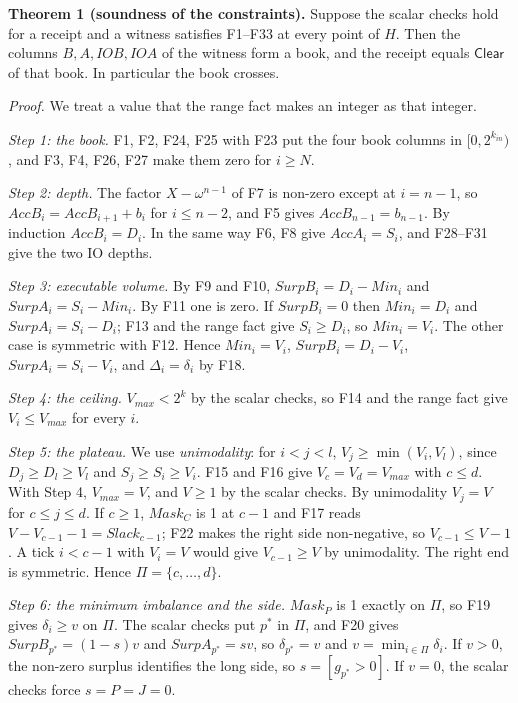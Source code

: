\textbf{Theorem 1 (soundness of the constraints).} Suppose the scalar checks hold for a receipt and a witness satisfies F1--F33 at every point of \(H\). Then the columns \(B, A, IOB, IOA\) of the witness form a book, and the receipt equals \(\mathsf{Clear}\) of that book. In particular the book crosses.

\emph{Proof.} We treat a value that the range fact makes an integer as that integer.

\emph{Step 1: the book.} F1, F2, F24, F25 with F23 put the four book columns in \([0, 2^{k_{in}})\), and F3, F4, F26, F27 make them zero for \(i \ge N\).

\emph{Step 2: depth.} The factor \(X - \omega^{n-1}\) of F7 is non-zero except at \(i = n-1\), so \(AccB_i = AccB_{i+1} + b_i\) for \(i \le n-2\), and F5 gives \(AccB_{n-1} = b_{n-1}\). By induction \(AccB_i = D_i\). In the same way F6, F8 give \(AccA_i = S_i\), and F28--F31 give the two IO depths.

\emph{Step 3: executable volume.} By F9 and F10, \(SurpB_i = D_i - Min_i\) and \(SurpA_i = S_i - Min_i\). By F11 one is zero. If \(SurpB_i = 0\) then \(Min_i = D_i\) and \(SurpA_i = S_i - D_i\); F13 and the range fact give \(S_i \ge D_i\), so \(Min_i = V_i\). The other case is symmetric with F12. Hence \(Min_i = V_i\), \(SurpB_i = D_i - V_i\), \(SurpA_i = S_i - V_i\), and \(\Delta_i = \delta_i\) by F18.

\emph{Step 4: the ceiling.} \(V_{max} < 2^k\) by the scalar checks, so F14 and the range fact give \(V_i \le V_{max}\) for every \(i\).

\emph{Step 5: the plateau.} We use \emph{unimodality}: for \(i < j < l\), \(V_j \ge \min(V_i, V_l)\), since \(D_j \ge D_l \ge V_l\) and \(S_j \ge S_i \ge V_i\). F15 and F16 give \(V_c = V_d = V_{max}\) with \(c \le d\). With Step 4, \(V_{max} = V\), and \(V \ge 1\) by the scalar checks. By unimodality \(V_j = V\) for \(c \le j \le d\). If \(c \ge 1\), \(Mask_C\) is 1 at \(c - 1\) and F17 reads \(V - V_{c-1} - 1 = Slack_{c-1}\); F22 makes the right side non-negative, so \(V_{c-1} \le V - 1\). A tick \(i < c-1\) with \(V_i = V\) would give \(V_{c-1} \ge V\) by unimodality. The right end is symmetric. Hence \(\Pi = \{c, \ldots, d\}\).

\emph{Step 6: the minimum imbalance and the side.} \(Mask_P\) is 1 exactly on \(\Pi\), so F19 gives \(\delta_i \ge v\) on \(\Pi\). The scalar checks put \(p^*\) in \(\Pi\), and F20 gives \(SurpB_{p^*} = (1-s)v\) and \(SurpA_{p^*} = sv\), so \(\delta_{p^*} = v\) and \(v = \min_{i \in \Pi} \delta_i\). If \(v > 0\), the non-zero surplus identifies the long side, so \(s = [g_{p^*} > 0]\). If \(v = 0\), the scalar checks force \(s = P = J = 0\).

